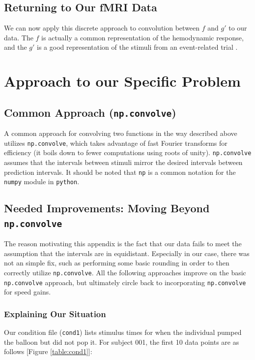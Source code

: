 \documentclass[11pt]{article}
\begin{document}
\subsection{Returning to Our fMRI Data}

We can now apply this discrete approach to convolution between $f$ and $g'$ 
to our data. The $f$ is actually a common representation of the hemodynamic 
response, and the $g'$ is a good representation of the stimuli from an 
event-related trial \cite{brett2015course}. 

\section{Approach to our Specific Problem}

\subsection{Common Approach (\texttt{np.convolve})}

A common approach for convolving two functions in the way described above 
utilizes \texttt{np.convolve}, which takes advantage of fast Fourier transforms 
for efficiency (it boils down to fewer computations using roots of unity). 
\texttt{np.convolve} assumes that the intervals between stimuli mirror the 
desired intervals between prediction intervals. It should be noted that 
\texttt{np} is a common notation for the \texttt{numpy} module in 
\texttt{python}.

\subsection{Needed Improvements: Moving Beyond \texttt{np.convolve}}

The reason motivating this appendix is the fact that our data fails to meet the 
assumption that the intervals are in equidistant. Especially in our case, there 
was not an simple fix, such as performing some basic rounding in order to then 
correctly utilize \texttt{np.convolve}. All the following approaches improve on 
the basic \texttt{np.convolve} approach, but ultimately circle back to 
incorporating \texttt{np.convolve} for speed gains. 

\subsubsection{Explaining Our Situation}
Our condition file (\texttt{cond1}) lists stimulus times for when the 
individual pumped the balloon but did not pop it. For subject 001, the 
first 10 data points are as follows [Figure \ref{table:cond1}]:
\end{document}
